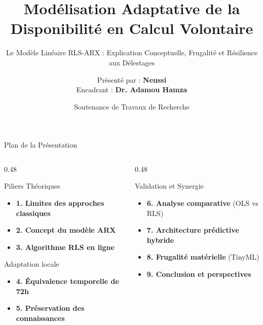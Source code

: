 \documentclass[10pt,aspectratio=169]{beamer}
\title[Modèle Linéaire RLS-ARX]{Modélisation Adaptative de la Disponibilité en Calcul Volontaire}
\subtitle{Le Modèle Linéaire RLS-ARX : Explication Conceptuelle, Frugalité et Résilience aux Délestages}
\author[Mémoire de Master 2]{Présenté par : \textbf{Neussi} \\[0.5em] \small Encadrant : \textbf{Dr. Adamou Hamza}}
\institute[UY1]{Université de Yaoundé I \\ Département d'Informatique \\ Spécialité : Systèmes et Réseaux}
\date[Juin 2026]{Soutenance de Travaux de Recherche}
\begin{document}
\begin{frame}
  \titlepage
\end{frame}

\begin{frame}{Plan de la Présentation}
  \begin{columns}[T]
    \begin{column}{0.48\textwidth}
      \begin{block}{Piliers Théoriques}
        \begin{itemize}
          \item \textbf{1. Limites des approches classiques}
          \item \textbf{2. Concept du modèle ARX}
          \item \textbf{3. Algorithme RLS en ligne}
        \end{itemize}
      \end{block}
      
      \begin{block}{Adaptation locale}
        \begin{itemize}
          \item \textbf{4. Équivalence temporelle de 72h}
          \item \textbf{5. Préservation des connaissances}
        \end{itemize}
      \end{block}
    \end{column}
    
    \begin{column}{0.48\textwidth}
      \begin{block}{Validation et Synergie}
        \begin{itemize}
          \item \textbf{6. Analyse comparative} (OLS vs RLS)
          \item \textbf{7. Architecture prédictive hybride}
          \item \textbf{8. Frugalité matérielle} (TinyML)
          \item \textbf{9. Conclusion et perspectives}
        \end{itemize}
      \end{block}
    \end{column}
  \end{columns}
\end{frame}
\end{document}
